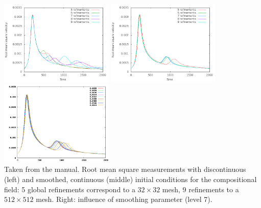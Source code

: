 \begin{itemize}
\begin{center}
\includegraphics[width=5.4cm]{images/benchmark_vaks97/aspect/velocity-discontinuous}
\includegraphics[width=5.4cm]{images/benchmark_vaks97/aspect/velocity-smooth}
\includegraphics[width=5.4cm]{images/benchmark_vaks97/aspect/smoothing-parameter-velocity}\\
{\captionfont Taken from the \aspect manual. 
Root mean square measurements with discontinuous (left) and smoothed, continuous 
(middle) initial conditions for the compositional field: 5 global refinements correspond to 
a $32\times 32$ mesh, 9 refinements to a $512 \times 512$ mesh.
Right: influence of smoothing parameter (level 7).}
\end{center}




\end{itemize}
